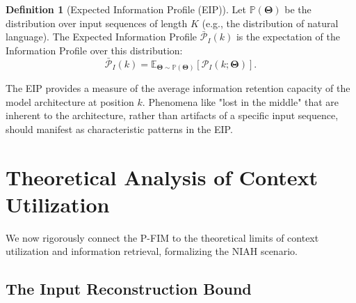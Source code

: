 \documentclass{article}
\theoremstyle{definition}
\newtheorem{definition}[theorem]{Definition}
\begin{document}
\begin{definition}[Expected Information Profile (EIP)]
Let $\mathbb{P}(\mathbf{\Theta})$ be the distribution over input sequences of length $K$ (e.g., the distribution of natural language). The Expected Information Profile $\bar{\mathcal{P}}_I(k)$ is the expectation of the Information Profile over this distribution:
\begin{equation}
    \bar{\mathcal{P}}_I(k) = \mathbb{E}_{\mathbf{\Theta} \sim \mathbb{P}(\mathbf{\Theta})} [\mathcal{P}_I(k; \mathbf{\Theta})].
\end{equation}
\end{definition}

The EIP provides a measure of the average information retention capacity of the model architecture at position $k$. Phenomena like "lost in the middle" that are inherent to the architecture, rather than artifacts of a specific input sequence, should manifest as characteristic patterns in the EIP.

\section{Theoretical Analysis of Context Utilization}
We now rigorously connect the P-FIM to the theoretical limits of context utilization and information retrieval, formalizing the NIAH scenario.


\subsection{The Input Reconstruction Bound}
\end{document}
